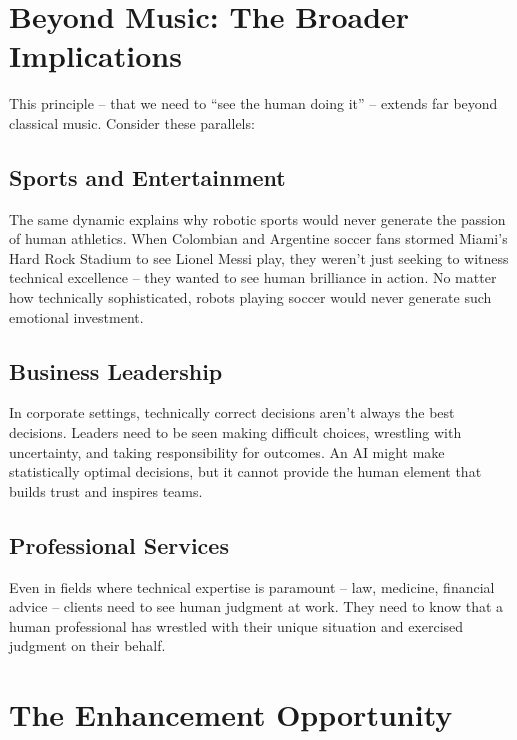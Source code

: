 \documentclass[
  Letterpaper,
]{scrbook}
\begin{document}
\section{Beyond Music: The Broader
Implications}\label{beyond-music-the-broader-implications}

This principle -- that we need to ``see the human doing it'' -- extends
far beyond classical music. Consider these parallels:

\subsection{Sports and Entertainment}\label{sports-and-entertainment}

The same dynamic explains why robotic sports would never generate the
passion of human athletics. When Colombian and Argentine soccer fans
stormed Miami's Hard Rock Stadium to see Lionel Messi play, they weren't
just seeking to witness technical excellence -- they wanted to see human
brilliance in action. No matter how technically sophisticated, robots
playing soccer would never generate such emotional investment.

\subsection{Business Leadership}\label{business-leadership}

In corporate settings, technically correct decisions aren't always the
best decisions. Leaders need to be seen making difficult choices,
wrestling with uncertainty, and taking responsibility for outcomes. An
AI might make statistically optimal decisions, but it cannot provide the
human element that builds trust and inspires teams.

\subsection{Professional Services}\label{professional-services}

Even in fields where technical expertise is paramount -- law, medicine,
financial advice -- clients need to see human judgment at work. They
need to know that a human professional has wrestled with their unique
situation and exercised judgment on their behalf.

\section{The Enhancement Opportunity}\label{the-enhancement-opportunity}
\end{document}

